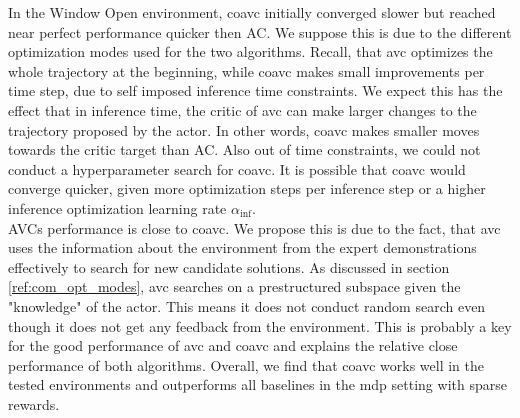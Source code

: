 In the Window Open environment, \ac{coavc} initially converged slower but 
reached near perfect performance quicker then AC. We suppose this is due to the different optimization modes used for the two algorithms. Recall, that \ac{avc} optimizes the whole 
trajectory at the beginning, while \ac{coavc} makes small improvements per time step, due to self imposed inference time constraints. We expect this has the effect that in inference time, the critic of 
\ac{avc} can make larger changes to the trajectory proposed by the actor. In other words, \ac{coavc} makes smaller moves towards the critic target than AC. Also out of time constraints, we could 
not conduct a hyperparameter search for \ac{coavc}. It is possible that \ac{coavc} would converge quicker, given more optimization steps per inference step or a higher inference optimization 
learning rate $\alpha_{\mathrm{inf}}$.\\ 

AVCs performance is close to \ac{coavc}. We propose this is due to the fact, that \ac{avc} uses the information about the environment 
from the expert demonstrations effectively to search for new candidate solutions. As discussed in section \ref{ref:com_opt_modes}, \ac{avc} searches on a prestructured subspace given the "knowledge" of the 
actor. This means it does not conduct random search even though it does not get any feedback from the environment. This is probably a key for the good performance of \ac{avc} and \ac{coavc} and explains 
the relative close performance of both algorithms. Overall, we find that \ac{coavc} works well in the tested environments and outperforms all baselines in the \ac{mdp} setting with sparse rewards.